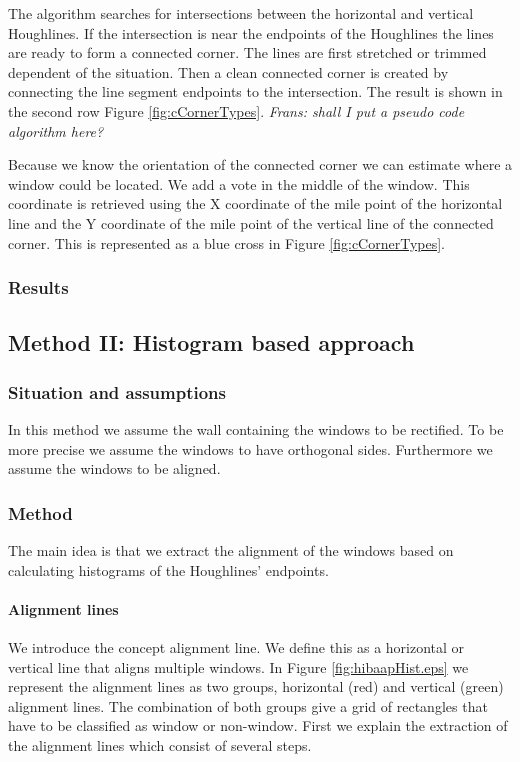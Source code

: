 The algorithm searches for intersections between the horizontal and vertical
Houghlines.  If the intersection is near the endpoints of the Houghlines the
lines are ready to form a connected corner.  The lines are first stretched or
trimmed dependent of the situation. Then a clean connected corner is created by
connecting the line segment endpoints to the intersection.
The result is shown in the second row Figure \ref{fig:cCornerTypes}.
\emph{Frans: shall I put a pseudo code algorithm here?}

Because we know the orientation of the connected corner we can estimate where
a window could be located.  We add a vote in the middle of the window. This
coordinate is retrieved using the X coordinate of the mile point of the horizontal line
and the Y coordinate of the mile point of the vertical line of the connected corner.  
This is represented as a blue cross in Figure \ref{fig:cCornerTypes}.

\subsubsection{Results}



\subsection{Method II: Histogram based approach} 
\subsubsection{Situation and assumptions}
In this method we assume the wall containing the windows to be rectified.
To be more precise we assume the windows to have orthogonal sides.
Furthermore we assume the windows to be aligned.

\subsubsection{Method}
The main idea is that we extract the alignment of the windows based on
calculating histograms of the Houghlines' endpoints.

\paragraph{Alignment lines}
We introduce the concept alignment line. We define this as a horizontal or
vertical line that aligns multiple windows. In Figure
\ref{fig:hibaapHist.eps}
we represent the alignment lines as two groups, horizontal (red) and
vertical (green) alignment lines.  The combination of both groups give a grid of
rectangles that have to be classified as window or non-window.
First we explain the extraction of the alignment lines which consist of several
steps.

